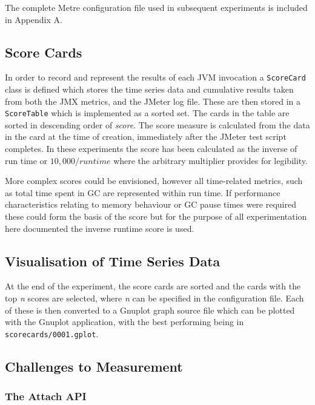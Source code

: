 \documentclass[]{final_report}
\begin{document}
The complete Metre configuration file used in subsequent experiments is included in Appendix A.

\subsection{Score Cards \label{score_cards}}

In order to record and represent the results of each JVM invocation a \lstinline{ScoreCard}\noop{} class is defined which stores the time series data and cumulative results taken from both the JMX metrics, and the JMeter log file. These are then stored in a \lstinline{ScoreTable}\noop{} which is implemented as a sorted set. The cards in the table are sorted in descending order of \textit{score}. The score measure is calculated from the data in the card at the time of creation, immediately after the JMeter test script completes. In these experiments the score has been calculated as the inverse of run time or $10,000/run time$ where the arbitrary multiplier provides for legibility.

More complex scores could be envisioned, however all time-related metrics, such as total time spent in GC are represented within run time. If performance characteristics relating to memory behaviour or GC pause times were required these could form the basis of the score but for the purpose of all experimentation here documented the inverse runtime score is used.

\subsection{Visualisation of Time Series Data \label{time_series}}

At the end of the experiment, the score cards are sorted and the cards with the top \textit{n} scores are selected, where \textit{n} can be specified in the configuration file. Each of these is then converted to a Gnuplot graph source file which can be plotted with the Gnuplot application, with the best performing being in \lstinline{scorecards/0001.gplot}.\noop{}

\subsection{Challenges to Measurement}
\subsubsection{The Attach API}
\end{document}
